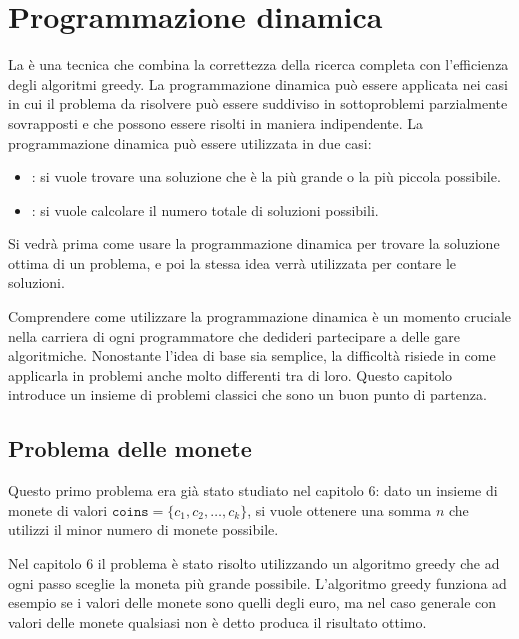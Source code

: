 \chapter{Programmazione dinamica}


La 
è una tecnica che combina la correttezza della
ricerca completa con l'efficienza degli algoritmi
greedy.
La programmazione dinamica può essere
applicata nei casi in cui il problema da risolvere
può essere suddiviso in sottoproblemi
parzialmente sovrapposti e che possono
essere risolti in maniera indipendente.
La programmazione dinamica può essere utilizzata
in due casi:

\begin{itemize}
\item
{}:
si vuole trovare una soluzione che è la
più grande o la più piccola possibile.
\item
{}:
si vuole calcolare il numero totale di 
soluzioni possibili.
\end{itemize}

Si vedrà prima come usare la programmazione
dinamica per trovare la soluzione ottima di un problema,
e poi la stessa idea verrà utilizzata per 
contare le soluzioni.

Comprendere come utilizzare la programmazione dinamica
è un momento cruciale nella carriera di ogni
programmatore che dedideri partecipare a delle gare algoritmiche.
Nonostante l'idea di base sia semplice,
la difficoltà risiede in come applicarla
in problemi anche molto differenti tra di loro.
Questo capitolo introduce un insieme di problemi classici 
che sono un buon punto di partenza.

\section{Problema delle monete}

Questo primo problema era già stato studiato 
nel capitolo 6: dato un insieme di monete di valori
$\texttt{coins} = \{c_1,c_2,\ldots,c_k\}$,
si vuole ottenere una somma
$n$ che utilizzi il minor numero di monete possibile.

Nel capitolo 6 il problema è stato risolto utilizzando
un algoritmo greedy che ad ogni passo sceglie 
la moneta più grande possibile.
L'algoritmo greedy funziona ad esempio se i valori delle
monete sono quelli degli euro,
ma nel caso generale con valori delle monete qualsiasi
non è detto produca il risultato ottimo.

